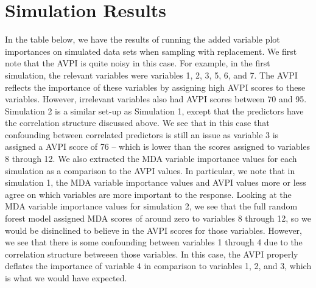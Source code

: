 \documentclass[12pt,twoside]{reedthesis}
\theoremstyle{definition}
\theoremstyle{definition}
\theoremstyle{definition}
\theoremstyle{remark}
\begin{document}
\section{Simulation Results}\label{simulation-results}

In the table below, we have the results of running the added variable
plot importances on simulated data sets when sampling with replacement.
We first note that the AVPI is quite noisy in this case. For example, in
the first simulation, the relevant variables were variables 1, 2, 3, 5,
6, and 7. The AVPI reflects the importance of these variables by
assigning high AVPI scores to these variables. However, irrelevant
variables also had AVPI scores between 70 and 95. Simulation 2 is a
similar set-up as Simulation 1, except that the predictors have the
correlation structure discussed above. We see that in this case that
confounding between correlated predictors is still an issue as variable
3 is assigned a AVPI score of 76 -- which is lower than the scores
assigned to variables 8 through 12. We also extracted the MDA variable
importance values for each simulation as a comparison to the AVPI
values. In particular, we note that in simulation 1, the MDA variable
importance values and AVPI values more or less agree on which variables
are more important to the response. Looking at the MDA variable
importance values for simulation 2, we see that the full random forest
model assigned MDA scores of around zero to variables 8 through 12, so
we would be disinclined to believe in the AVPI scores for those
variables. However, we see that there is some confounding between
variables 1 through 4 due to the correlation structure betweeen those
variables. In this case, the AVPI properly deflates the importance of
variable 4 in comparison to variables 1, 2, and 3, which is what we
would have expected. \par
\end{document}
